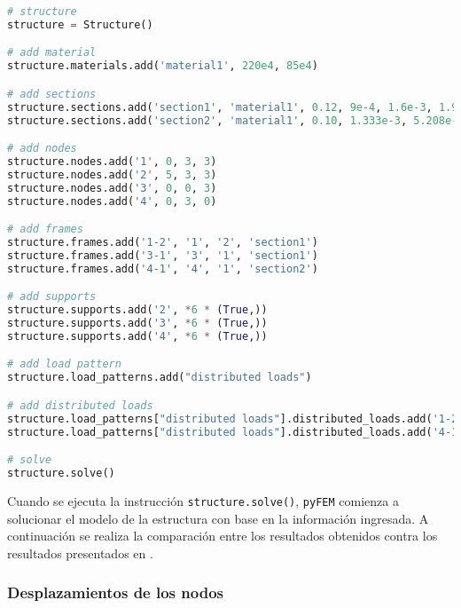 \begin{lstlisting}[language=Python,caption=Ingreso de los datos del modelo de la estructura a \texttt{pyFEM}.,label=alg:portico_tridimensional, frame=single]
# structure
structure = Structure()

# add material
structure.materials.add('material1', 220e4, 85e4)

# add sections
structure.sections.add('section1', 'material1', 0.12, 9e-4, 1.6e-3, 1.944e-3)
structure.sections.add('section2', 'material1', 0.10, 1.333e-3, 5.208e-4, 1.2734e-3)

# add nodes
structure.nodes.add('1', 0, 3, 3)
structure.nodes.add('2', 5, 3, 3)
structure.nodes.add('3', 0, 0, 3)
structure.nodes.add('4', 0, 3, 0)

# add frames
structure.frames.add('1-2', '1', '2', 'section1')
structure.frames.add('3-1', '3', '1', 'section1')
structure.frames.add('4-1', '4', '1', 'section2')

# add supports
structure.supports.add('2', *6 * (True,))
structure.supports.add('3', *6 * (True,))
structure.supports.add('4', *6 * (True,))

# add load pattern
structure.load_patterns.add("distributed loads")

# add distributed loads
structure.load_patterns["distributed loads"].distributed_loads.add('1-2', 0, -2.4, 0)
structure.load_patterns["distributed loads"].distributed_loads.add('4-1', 0, -3.5, 0)

# solve
structure.solve()
\end{lstlisting}

Cuando se ejecuta la instrucción \texttt{structure.solve()}, \texttt{pyFEM} comienza a solucionar el modelo de la estructura con base en la información ingresada. A continuación se realiza la comparación entre los resultados obtenidos contra los resultados presentados en \cite{escamilla1995microcomputadores}.

\subsubsection{Desplazamientos de los nodos}

